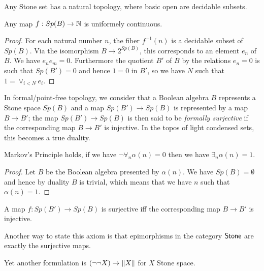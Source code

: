 Any Stone set has a natural topology, where basic open are decidable subsets.

\medskip

\begin{proposition}
Any map $f: Sp(B)\rightarrow\mathbb{N}$ is uniformely continuous.
\end{proposition}  

\begin{proof}
  For each natural number $n$, the fiber $f^{-1}(n)$ is a decidable
  subset of $Sp(B)$. Via the isomorphism $B\rightarrow 2^{Sp(B)}$, this corresponds to an element $e_n$ of $B$. We have
  $e_ne_m = 0$. Furthermore the quotient $B'$ of $B$ by the relations $e_n = 0$ is such that $Sp(B') = 0$ and hence
  $1 = 0$ in $B'$, so we have $N$ such that $1 = \vee_{i<N}e_i$.
\end{proof}

\medskip

In formal/point-free topology, we consider that a Boolean algebra $B$ represents a Stone space $Sp(B)$ and a map
$Sp(B') \to Sp(B)$ is represented by a map $B\rightarrow B'$; the map $Sp(B')\to Sp(B)$ is then said to be
{\em formally surjective} if the corresponding map $B\to B'$ is injective. In the topos of light condensed sets,
this becomes a true duality.

\begin{proposition}
Markov's Principle holds, if we have $\neg \forall_n\alpha(n) = 0$ then we have $\exists_n \alpha(n) = 1$.
\end{proposition}

\begin{proof}
  Let $B$ be the Boolean algebra presented by $\alpha(n)$. We have $Sp(B) = \emptyset$ and hence by duality
  $B$ is trivial, which means that we have $n$ such that $\alpha(n) = 1$.
\end{proof}






\begin{axiom}
  A map $f:Sp(B')\to Sp(B)$ is surjective iff the corresponding map $B \to B'$ is injective.
\end{axiom} 

Another way to state this axiom is that epimorphisms in the category $\mathsf{Stone}$ are exactly the surjective maps.

Yet another formulation is $(\neg \neg X)\rightarrow \lVert X \rVert$ for $X$ Stone space.

\medskip

